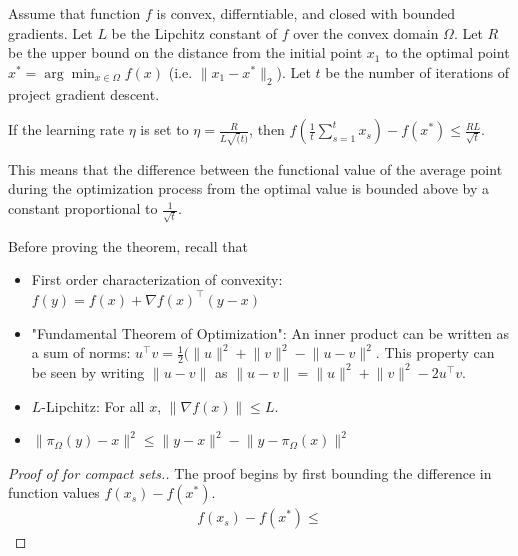 \begin{theorem}
Assume that function $f$ is convex, differntiable, and closed with bounded gradients. Let $L$ be the Lipchitz constant of $f$ over the convex domain $\Omega$. Let $R$ be the upper bound on the distance from the initial point $x_1$ to the optimal point $x^* = \arg\min_{x \in \Omega} f(x)$ (i.e. $\lVert x_1 - x^* \rVert_2$). Let $t$ be the number of iterations of project gradient descent.

If the learning rate $\eta$ is set to $\eta=\frac{R}{L \sqrt(t)}$, then $f\left(\frac{1}{t}\sum_{s=1}^t x_s\right) - f\left(x^*\right) \leq \frac{RL}{\sqrt{t}}$.

This means that the difference between the functional value of the average point during the optimization process from the optimal value is bounded above by a constant proportional to $\frac{1}{\sqrt{t}}$.

\end{theorem}

Before proving the theorem, recall that
\begin{itemize}
    \item First order characterization of convexity: $f(y) = f(x) + \nabla f(x)^\top (y - x)$
    \item "Fundamental Theorem of Optimization": An inner product can be written as a sum of norms: $u^\top v = \frac{1}{2}(\lVert u \rVert^2 + \lVert v \lVert^2 - \lVert u - v \rVert^2$. This property can be seen by writing $\lVert u - v \rVert$ as $\lVert u - v \rVert = \lVert u \rVert^2 + \lVert v \lVert^2 - 2 u^\top v$.
    \item $L$-Lipchitz: For all $x$, $\lVert \nabla f(x) \rVert \leq L$.
    \item $\lVert \pi_\Omega (y) - x \rVert^2 \leq \lVert y - x \rVert^2 - \lVert y - \pi_\Omega (x) \rVert^2$ %
\end{itemize}


\begin{proof}[Proof of  for compact sets.]
The proof begins by first bounding the difference in function values $f(x_s) - f(x^*)$.
\begin{align}
    f(x_s) - f(x^*) \leq
\end{align}
\end{proof}
